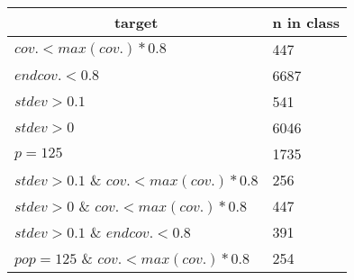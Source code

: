 \begin{tabular}{ll}
\hline
\multicolumn{1}{c}{target}                & n in class                                                                                                                                      \\
\hline
$cov. < max(cov.) * 0.8$                  & 447                  \\
$end cov. < 0.8$                          & 6687                                                                                                                              \\
$stdev > 0.1$                             & 541                                                                                                                  \\
$stdev > 0$                               & 6046                                                                                                                 \\
$p = 125$                               & 1735        \\
$stdev > 0.1$ \& $cov. < max(cov.) * 0.8$ & 256                                                                                                                       \\
$stdev > 0$ \& $cov. < max(cov.) * 0.8$   & 447                                                                                                                     \\
$stdev > 0.1$ \& $end cov. < 0.8$         & 391                                                                                                                       \\
$pop = 125$ \& $cov. < max(cov.) * 0.8$   & 254                                                                                                                  \\
\hline                                                                                                               
\end{tabular}